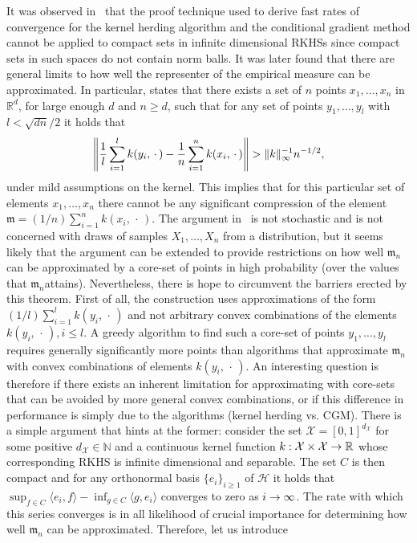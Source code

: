 \documentclass[10pt]{amsart}
\theoremstyle{definition}\newtheorem{defi}[theo]{Definition}\newtheorem{rema}[theo]{Remark}\newtheorem{exam}[theo]{Example}\newtheorem{exem}[theo]{Example}\newtheorem{nota}[theo]{Notation}
\theoremstyle{remark}
\newcommand{\R}{\mathbb{R}}
\newcommand{\bbN}{\mathbb{N}}
\newcommand{\X}{\mathcal{X}}
\newcommand{\cH}{\mathcal{H}}
\newcommand{\mean}{\mathfrak{m}}
\renewcommand*{\to}{\mathchoice{\longrightarrow}{\rightarrow}{\rightarrow}{\rightarrow}}
\let\originalleft\left
\let\originalright\right
\renewcommand{\left}{\mathopen{}\mathclose\bgroup\originalleft}
\renewcommand{\right}{\aftergroup\egroup\originalright}
\begin{document}
It was observed in~\cite{BACH12} that the proof technique used to derive fast rates of convergence for the kernel herding algorithm and the conditional gradient method cannot be applied to compact sets in infinite dimensional RKHSs since compact sets in such spaces do not contain norm balls. It was later found that there are general limits to how well the representer of the empirical measure can be approximated. In particular, \cite[Theorem~3.1]{PHIL20} states that there exists a set of $n$ points $x_1,\dots, x_n$ in $\R^d$, for large enough $d$ and $n \geq d$, such that for any set of points $y_1, \dots, y_l$ with $l < \sqrt{dn}/2$ it holds that
\[
\left\| \frac{1}{l} \sum_{i=1}^l k(y_i,\,\cdot\,) - \frac{1}{n} \sum_{i=1}^n k(x_i,\,\cdot\,) \right\| > \|k\|_\infty^{-1} n^{-1/2},
\]
under mild assumptions on the kernel. This implies that for this particular set of elements $x_1,\dots, x_n$ there cannot be any significant compression of the element $\mean = (1/n) \sum_{i=1}^n k(x_i,\,\cdot\,)$. The argument in~\cite{PHIL20} is not stochastic and is not concerned with draws of samples $X_1,\dots, X_n$ from a distribution, but it seems likely that the argument can be extended to provide restrictions on how well $\mean_n$ can be approximated by a core-set of points in high probability (over the values that $\mean_n$\linebreak attains). Nevertheless, there is hope to circumvent the barriers erected by this theorem. First of all, the construction uses approximations of the form $(1/l) \sum_{i=1}^l k(y_i,\,\cdot\,)$ and not arbitrary convex combinations of the elements $k(y_i,\,\cdot\,), i \leq l$. A greedy algorithm to find such a core-set of points $y_1,\dots, y_l$ requires generally significantly more points than algorithms that approximate $\mean_n$ with convex combinations of elements $k(y_i,\,\cdot\,)$. An interesting question is therefore if there exists an inherent limitation for approximating with core-sets that can be avoided by more general convex combinations, or if this difference in performance is simply due to the algorithms (kernel herding vs. CGM). There is a simple argument that hints at the former: consider the set $\X = [0,1]^{d_\X}$ for some positive $d_\X \in \bbN$ and a continuous kernel function $k:\X \times \X \to \R$ whose corresponding RKHS is infinite dimensional and separable. The set $C$ is then compact and for any orthonormal basis $\{e_i\}_{i \geq 1}$ of $\cH$ it holds that $\sup_{f \in C} \langle e_i,f \rangle - \inf_{g \in C} \langle g, e_i \rangle$ converges to zero as $i \to \infty$. The rate with which this series converges is in all likelihood of crucial importance for determining how well $\mean_n$ can be approximated. Therefore, let us introduce
\end{document}
